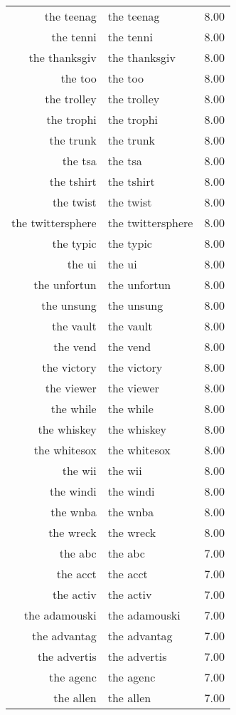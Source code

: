 \begin{table}[ht]
\begin{tabular}{rlr}
  the teenag & the teenag & 8.00 \\ 
  the tenni & the tenni & 8.00 \\ 
  the thanksgiv & the thanksgiv & 8.00 \\ 
  the too & the too & 8.00 \\ 
  the trolley & the trolley & 8.00 \\ 
  the trophi & the trophi & 8.00 \\ 
  the trunk & the trunk & 8.00 \\ 
  the tsa & the tsa & 8.00 \\ 
  the tshirt & the tshirt & 8.00 \\ 
  the twist & the twist & 8.00 \\ 
  the twittersphere & the twittersphere & 8.00 \\ 
  the typic & the typic & 8.00 \\ 
  the ui & the ui & 8.00 \\ 
  the unfortun & the unfortun & 8.00 \\ 
  the unsung & the unsung & 8.00 \\ 
  the vault & the vault & 8.00 \\ 
  the vend & the vend & 8.00 \\ 
  the victory & the victory & 8.00 \\ 
  the viewer & the viewer & 8.00 \\ 
  the while & the while & 8.00 \\ 
  the whiskey & the whiskey & 8.00 \\ 
  the whitesox & the whitesox & 8.00 \\ 
  the wii & the wii & 8.00 \\ 
  the windi & the windi & 8.00 \\ 
  the wnba & the wnba & 8.00 \\ 
  the wreck & the wreck & 8.00 \\ 
  the abc & the abc & 7.00 \\ 
  the acct & the acct & 7.00 \\ 
  the activ & the activ & 7.00 \\ 
  the adamouski & the adamouski & 7.00 \\ 
  the advantag & the advantag & 7.00 \\ 
  the advertis & the advertis & 7.00 \\ 
  the agenc & the agenc & 7.00 \\ 
  the allen & the allen & 7.00 \\ 

\end{tabular}
\end{table}
